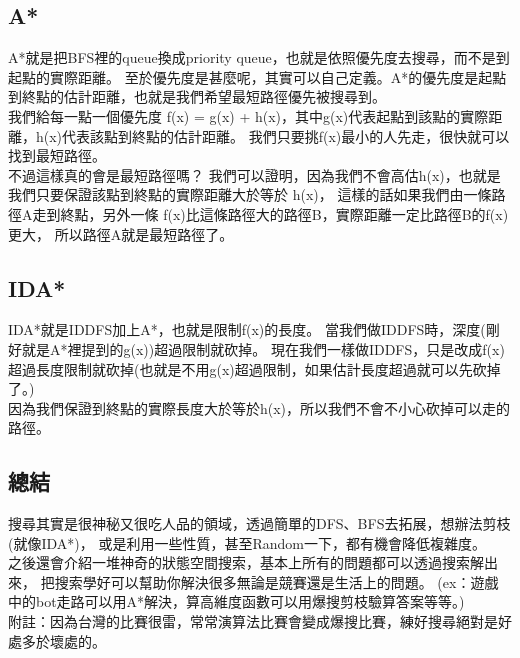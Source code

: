 \documentclass{article}
\begin{document}
\subsection{A*}
A*就是把BFS裡的queue換成priority queue，也就是依照優先度去搜尋，而不是到起點的實際距離。
至於優先度是甚麼呢，其實可以自己定義。A*的優先度是起點到終點的估計距離，也就是我們希望最短路徑優先被搜尋到。\\
我們給每一點一個優先度 f(x) = g(x) + h(x)，其中g(x)代表起點到該點的實際距離，h(x)代表該點到終點的估計距離。
我們只要挑f(x)最小的人先走，很快就可以找到最短路徑。\\
不過這樣真的會是最短路徑嗎？
我們可以證明，因為我們不會高估h(x)，也就是我們只要保證該點到終點的實際距離大於等於 h(x)，
這樣的話如果我們由一條路徑A走到終點，另外一條 f(x)比這條路徑大的路徑B，實際距離一定比路徑B的f(x)更大，
所以路徑A就是最短路徑了。

\subsection{IDA*}
IDA*就是IDDFS加上A*，也就是限制f(x)的長度。
當我們做IDDFS時，深度(剛好就是A*裡提到的g(x))超過限制就砍掉。
現在我們一樣做IDDFS，只是改成f(x)超過長度限制就砍掉(也就是不用g(x)超過限制，如果估計長度超過就可以先砍掉了。)\\
因為我們保證到終點的實際長度大於等於h(x)，所以我們不會不小心砍掉可以走的路徑。

\subsection{總結}
搜尋其實是很神秘又很吃人品的領域，透過簡單的DFS、BFS去拓展，想辦法剪枝(就像IDA*)，
或是利用一些性質，甚至Random一下，都有機會降低複雜度。\\
之後還會介紹一堆神奇的狀態空間搜索，基本上所有的問題都可以透過搜索解出來，
把搜索學好可以幫助你解決很多無論是競賽還是生活上的問題。
(ex：遊戲中的bot走路可以用A*解決，算高維度函數可以用爆搜剪枝驗算答案等等。)\\
附註：因為台灣的比賽很雷，常常演算法比賽會變成爆搜比賽，練好搜尋絕對是好處多於壞處的。
\end{document}
